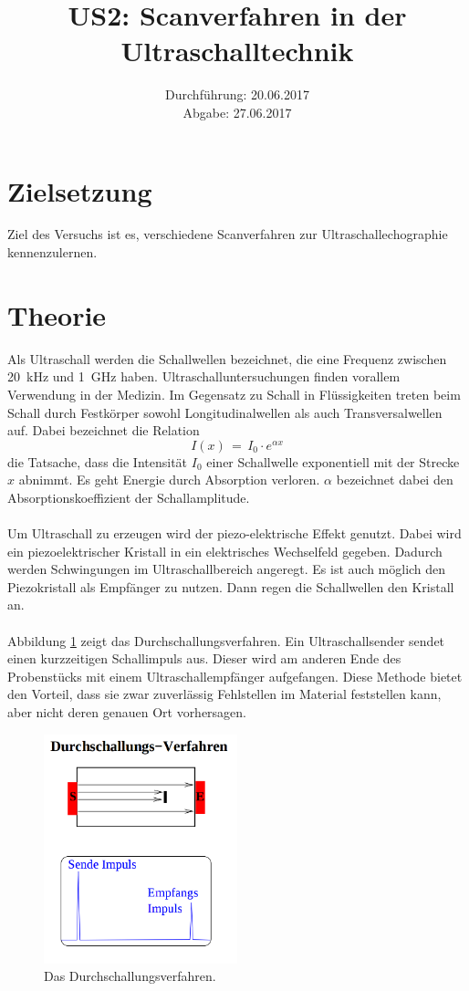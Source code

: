 \documentclass[
  bibliography=totoc,     %
  captions=tableheading,  %
  titlepage=firstiscover, %
]{scrartcl}
\title{US2: Scanverfahren in der Ultraschalltechnik}
\author{
  Simon Schulte
  \texorpdfstring{
    \\
    \href{mailto:simon.schulte@udo.edu}{simon.schulte@udo.edu}
  }{}
  \texorpdfstring{\and}{, }
  Tim Sedlaczek
  \texorpdfstring{
    \\
    \href{mailto:tim.sedlaczek@udo.edu}{tim.sedlaczek@udo.edu}
  }{}
}
\date{Durchführung: 20.06.2017\\
      Abgabe: 27.06.2017}
\begin{document}
\maketitle
\thispagestyle{empty}
\tableofcontents
\newpage
\setcounter{page}{1}
\section{Zielsetzung}
\label{sec:zielsetzung}
Ziel des Versuchs ist es, verschiedene Scanverfahren zur
Ultraschallechographie kennenzulernen.
\section{Theorie}
\label{sec:theorie}
Als Ultraschall werden die Schallwellen bezeichnet, die eine Frequenz zwischen
\SI{20}{\kilo\hertz} und \SI{1}{\giga\hertz} haben. Ultraschalluntersuchungen
finden vorallem Verwendung in der Medizin.
Im Gegensatz zu Schall in Flüssigkeiten treten beim Schall durch Festkörper sowohl
Longitudinalwellen als auch Transversalwellen auf. Dabei bezeichnet die Relation
\begin{equation}
  I(x)\,=\,I_0 \cdot e^{\alpha x}
  \label{eqn:intensität}
\end{equation}
die Tatsache, dass die Intensität $I_0$ einer Schallwelle exponentiell mit der
Strecke $x$ abnimmt. Es geht Energie durch Absorption verloren. $\alpha$
bezeichnet dabei den Absorptionskoeffizient der Schallamplitude. \\
\\
Um Ultraschall zu erzeugen wird der piezo-elektrische Effekt genutzt. Dabei
wird ein piezoelektrischer Kristall in ein elektrisches Wechselfeld gegeben.
Dadurch werden Schwingungen im Ultraschallbereich angeregt. Es ist auch möglich
den Piezokristall als Empfänger zu nutzen. Dann regen die Schallwellen den
Kristall an. \\
\\
Abbildung \ref{fig:US22} zeigt das Durchschallungsverfahren. Ein
Ultraschallsender sendet einen kurzzeitigen Schallimpuls aus. Dieser wird am
anderen Ende des Probenstücks mit einem Ultraschallempfänger aufgefangen. Diese
Methode bietet den Vorteil, dass sie zwar zuverlässig Fehlstellen im Material
feststellen kann, aber nicht deren genauen Ort vorhersagen.
\begin{figure}[H]
  \centering
  \includegraphics[width=0.5\textwidth]{US22.png}
  \caption{Das Durchschallungsverfahren. \cite{anleitung}}
  \label{fig:US22}
\end{figure}
\end{document}
